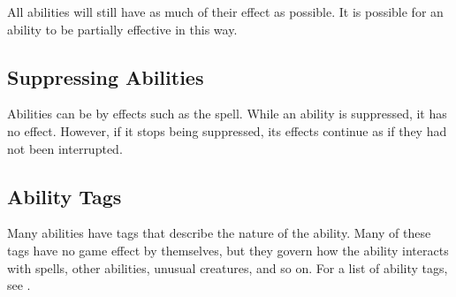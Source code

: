     All abilities will still have as much of their effect as possible.
    It is possible for an ability to be partially effective in this way.

  \subsection{Suppressing Abilities}\label{Suppressing Abilities}
    Abilities can be  by effects such as the  spell.
    While an ability is suppressed, it has no effect.
    However, if it stops being suppressed, its effects continue as if they had not been interrupted.

  \subsection{Ability Tags}
    Many abilities have tags that describe the nature of the ability.
    Many of these tags have no game effect by themselves, but they govern how the ability interacts with spells, other abilities, unusual creatures, and so on.
    For a list of ability tags, see .
